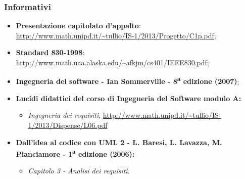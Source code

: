 	\subsubsection{Informativi}
		\begin{itemize}
			\item \textbf{Presentazione capitolato d'appalto}: \url{http://www.math.unipd.it/~tullio/IS-1/2013/Progetto/C1p.pdf};
			\item \textbf{Standard 830-1998}: \url{http://www.math.uaa.alaska.edu/~afkjm/cs401/IEEE830.pdf}; 
			\item \textbf{Ingegneria del software - Ian Sommerville - 8\textsuperscript{a} edizione (2007)};
			\item \textbf{Lucidi didattici del corso di Ingegneria del Software modulo A:}
			\begin{itemize}
				\item \textit{Ingegneria dei requisiti}, \url{http://www.math.unipd.it/~tullio/IS-1/2013/Dispense/L06.pdf}
			\end{itemize}
			\item \textbf{Dall'idea al codice con UML 2 - L. Baresi, L. Lavazza, M. Pianciamore - 1\textsuperscript{a} edizione (2006):}
			\begin{itemize}			
				\item \textit{Capitolo 3 - Analisi dei requisiti}.			
			\end{itemize}
		\end{itemize}
		
